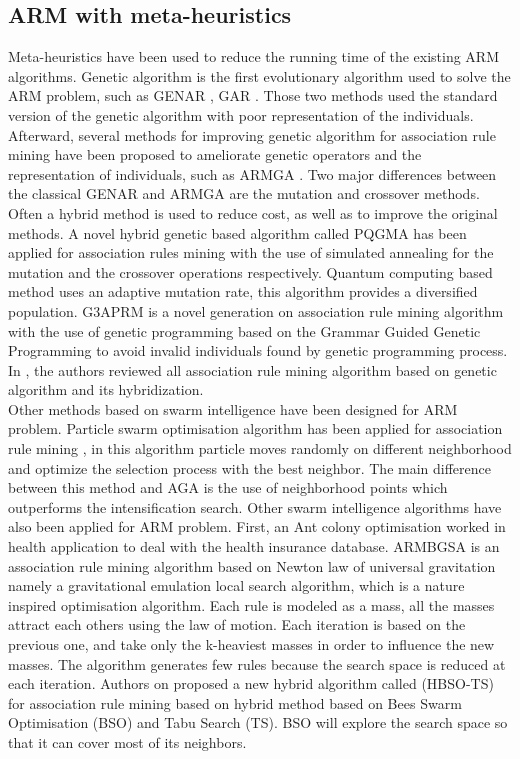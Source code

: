 \documentclass[preprint,12pt]{elsarticle}
\begin{document}
\subsection{ARM with meta-heuristics}
Meta-heuristics have been used to reduce the running time of the existing ARM algorithms. Genetic algorithm is the first evolutionary algorithm used to solve the ARM problem, such as GENAR \cite{16}, GAR \cite{17}. 
Those two methods used the standard version of the genetic algorithm with poor representation of the individuals. Afterward, several methods 
for improving genetic algorithm for association rule mining have been proposed to ameliorate genetic operators and the 
representation of individuals, such as ARMGA \cite{10}. Two major differences between the classical GENAR and ARMGA are the mutation and crossover methods. Often a hybrid method is used to reduce cost, as well as to improve the original methods. A novel hybrid genetic based algorithm called PQGMA has been applied for association rules mining with the use of simulated annealing for the mutation and the crossover operations respectively.
Quantum computing based method \cite{18} uses an adaptive mutation rate, this algorithm provides a diversified population.
G3APRM \cite{11} is a novel generation on association rule mining algorithm with the use of  genetic programming based on the 
Grammar Guided Genetic Programming to avoid invalid individuals found by genetic programming process. In \cite{19}, 
the authors reviewed all association rule mining algorithm based on genetic algorithm and its hybridization.\\
Other methods based on swarm intelligence have been designed for ARM problem. 
Particle swarm optimisation algorithm has been applied for association rule mining \cite{12}, 
in this algorithm particle moves randomly on different neighborhood and optimize the selection process with the best neighbor. 
The main difference between this method and AGA is the use of neighborhood points which outperforms the intensification search. 
Other swarm intelligence algorithms have also been applied for ARM problem. First, an Ant colony optimisation \cite{20} worked in health application 
to deal with the health insurance database. ARMBGSA \cite{21} is an association rule mining algorithm based on Newton law of universal gravitation namely 
a gravitational emulation local search algorithm, which is a nature inspired optimisation algorithm. Each rule is modeled as a mass, all the masses attract each others using the law of motion. Each iteration is based on the 
previous one, and take only the k-heaviest masses in order to influence the new masses. The algorithm generates few rules because 
the search space is reduced at each iteration. 
Authors on \cite{22} proposed a new hybrid algorithm called (HBSO-TS) for association rule mining based on hybrid method based on 
Bees Swarm Optimisation (BSO) and Tabu Search (TS). BSO will explore the search space so that it can cover most of its neighbors. 
\end{document}
